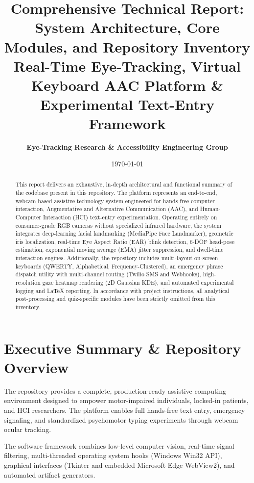 \documentclass[11pt,a4paper]{article}
\title{\textbf{\LARGE Comprehensive Technical Report: System Architecture, Core Modules, and Repository Inventory}\\[0.4em]
\large Real-Time Eye-Tracking, Virtual Keyboard AAC Platform \& Experimental Text-Entry Framework}
\author{\textbf{Eye-Tracking Research \& Accessibility Engineering Group}}
\date{\today}
\begin{document}
\maketitle

\begin{abstract}
This report delivers an exhaustive, in-depth architectural and functional summary of the codebase present in this repository. The platform represents an end-to-end, webcam-based assistive technology system engineered for hands-free computer interaction, Augmentative and Alternative Communication (AAC), and Human-Computer Interaction (HCI) text-entry experimentation. Operating entirely on consumer-grade RGB cameras without specialized infrared hardware, the system integrates deep-learning facial landmarking (MediaPipe Face Landmarker), geometric iris localization, real-time Eye Aspect Ratio (EAR) blink detection, 6-DOF head-pose estimation, exponential moving average (EMA) jitter suppression, and dwell-time interaction engines. Additionally, the repository includes multi-layout on-screen keyboards (QWERTY, Alphabetical, Frequency-Clustered), an emergency phrase dispatch utility with multi-channel routing (Twilio SMS and Webhooks), high-resolution gaze heatmap rendering (2D Gaussian KDE), and automated experimental logging and LaTeX reporting. In accordance with project instructions, all analytical post-processing and quiz-specific modules have been strictly omitted from this inventory.
\end{abstract}

\tableofcontents
\newpage

\section{Executive Summary \& Repository Overview}

The repository provides a complete, production-ready assistive computing environment designed to empower motor-impaired individuals, locked-in patients, and HCI researchers. The platform enables full hands-free text entry, emergency signaling, and standardized psychomotor typing experiments through webcam ocular tracking. 

The software framework combines low-level computer vision, real-time signal filtering, multi-threaded operating system hooks (Windows Win32 API), graphical interfaces (Tkinter and embedded Microsoft Edge WebView2), and automated artifact generators.
\end{document}
